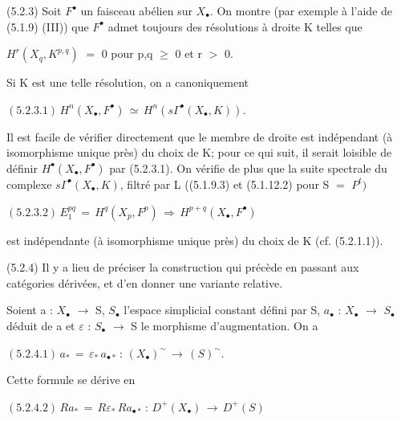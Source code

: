 \documentclass[11pt,twoside]{article}
\newcommand{\DFormula}[1]{%
  \par\smallskip\noindent\hspace*{0pt}\(\displaystyle #1\)\par\smallskip
}
\begin{document}
(5.2.3) Soit \(F^{\bullet }\) un faisceau abélien sur \(X_{\bullet }\). On montre (par exemple à l’aide de (5.1.9) (III)) que \(F^{\bullet }\) admet toujours des résolutions à droite K telles que\par
\par\medskip
\(H^{r}(X_{q},K^{p,q})\) \(=\) 0   pour p,q \(\geq \) 0 et r \(>\) 0.\par
\par\medskip
Si K est une telle résolution, on a canoniquement\par
\par\medskip
\DFormula{(5.2.3.1)\,H^{n}(X_{\bullet },F^{\bullet })\,\simeq \,H^{n}(s\Gamma ^{\bullet }(X_{\bullet },K)).}
\par\medskip
Il est facile de vérifier directement que le membre de droite est indépendant (à isomorphisme unique près) du choix de K; pour ce qui suit, il serait loisible de définir \(H^{\bullet }(X_{\bullet },F^{\bullet })\) par (5.2.3.1). On vérifie de plus que la suite spectrale du complexe \(s\Gamma ^{\bullet }(X_{\bullet },K)\), filtré par L ((5.1.9.3) et (5.1.12.2) pour S \(=\) \(P^{t})\)\par
\par\medskip
\DFormula{(5.2.3.2)\,E_{1}^{pq}\,=\,H^{q}(X_{p},F^{p})\,\Rightarrow \,H^{p+q}(X_{\bullet },F^{\bullet })}
\par\medskip
est indépendante (à isomorphisme unique près) du choix de K (cf. (5.2.1.1)).\par
\par\medskip
(5.2.4) Il y a lieu de préciser la construction qui précède en passant aux catégories dérivées, et d’en donner une variante relative.\par
\par\medskip
Soient a : \(X_{\bullet }\) \(\to \) S, \(S_{\bullet }\) l’espace simplicial constant défini par S, \(a_{\bullet }\) : \(X_{\bullet }\) \(\to \) \(S_{\bullet }\) déduit de a et \(\varepsilon \) : \(S_{\bullet }\) \(\to \) S le morphisme d’augmentation. On a\par
\par\medskip
\DFormula{(5.2.4.1)\,a_{\ast }\,=\,\varepsilon _{\ast }\,a_{\bullet \ast }\,:\,(X_{\bullet })^{\sim }\,\to \,(S)^{\sim }.}
\par\medskip
Cette formule se dérive en\par
\par\medskip
\DFormula{(5.2.4.2)\,Ra_{\ast }\,=\,R\varepsilon _{\ast }\,Ra_{\bullet \ast }\,:\,D^{+}(X_{\bullet })\,\to \,D^{+}(S)}
\par\medskip
\end{document}

